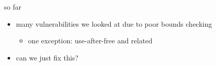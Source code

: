 \begin{frame}{so far}
    \begin{itemize}
    \item many vulnerabilities we looked at due to poor bounds checking
        \begin{itemize}
        \item one exception: use-after-free and related
        \end{itemize}
    \vspace{.5cm}
    \item can we just fix this?
    \end{itemize}
\end{frame}
